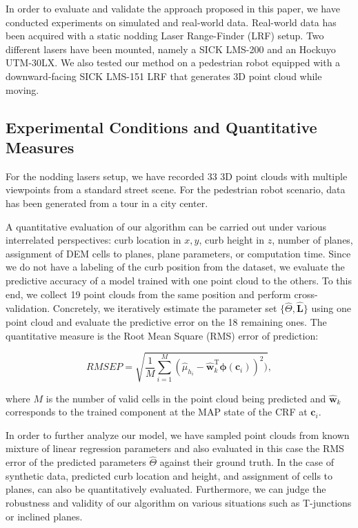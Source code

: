 In order to evaluate and validate the approach proposed in this paper, we have
conducted experiments on simulated and real-world data. Real-world data
has been acquired with a static nodding Laser Range-Finder (LRF) setup. Two
different lasers have been mounted, namely a SICK LMS-200 and an Hockuyo
UTM-30LX. We also tested our method on a pedestrian robot equipped with a
downward-facing SICK LMS-151 LRF that generates 3D point cloud while moving.

\subsection{Experimental Conditions and Quantitative Measures}

For the nodding lasers setup, we have recorded 33 3D point clouds with multiple
viewpoints from a standard street scene. For the pedestrian robot scenario, data
has been generated from a tour in a city center.

A quantitative evaluation of our algorithm can be carried out under various
interrelated perspectives: curb location in $x,y$, curb height in $z$,
number of planes, assignment of DEM cells to planes, plane parameters, or
computation time. Since we do not have a labeling of the curb position from
the dataset, we evaluate the predictive accuracy of a model trained
with one point cloud to the others. To this end, we collect 19 point clouds from
the same position and perform cross-validation. Concretely, we iteratively
estimate the parameter set $\{\hat{\Theta},\mathbf{\hat{L}}\}$ using one point
cloud and evaluate the predictive error on the 18 remaining ones. The
quantitative measure is the Root Mean Square (RMS) error of prediction:

\begin{equation}
\label{eqn:rmspred}
RMSEP=\sqrt{\frac{1}{M}\sum_{i=1}^M(\hat{\mu}_{h_i}-\mathbf{\hat{w}}_k^\text{T}
\boldsymbol{\phi}(\mathbf{c}_i))^ 2)},
\end{equation}

where $M$ is the number of valid cells in the point cloud being predicted and
$\mathbf{\hat{w}}_k$ corresponds to the trained component at the MAP state of
the CRF at $\mathbf{c}_i$.

In order to further analyze our model, we have sampled point clouds from known
mixture of linear regression parameters and also evaluated in this case the RMS
error of the predicted parameters $\hat{\Theta}$ against their ground truth. In
the case of synthetic data, predicted curb location and height, and assignment
of cells to planes, can also be quantitatively evaluated. Furthermore, we can
judge the robustness and validity of our algorithm on various situations such
as T-junctions or inclined planes.

